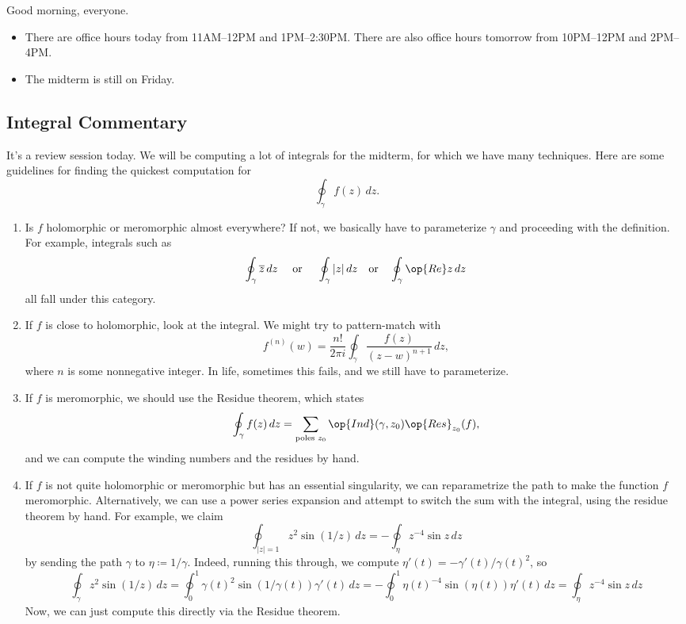 \documentclass[../notes.tex]{subfiles}
\begin{document}

Good morning, everyone.
\begin{itemize}
	\item There are office hours today from 11AM--12PM and 1PM--2:30PM. There are also office hours tomorrow from 10PM--12PM and 2PM--4PM.
	\item The midterm is still on Friday.
\end{itemize}

\subsection{Integral Commentary}
It's a review session today. We will be computing a lot of integrals for the midterm, for which we have many techniques. Here are some guidelines for finding the quickest computation for
\[\oint_\gamma f(z)\,dz.\]
\begin{enumerate}
	\item Is $f$ holomorphic or meromorphic almost everywhere? If not, we basically have to parameterize $\gamma$ and proceeding with the definition. For example, integrals such as
	\[\oint_\gamma\overline z\,dz\quad\text{ or }\quad\oint_\gamma|z|\,dz\quad\text{or}\quad\oint_\gamma\op{Re}z\,dz\]
	all fall under this category.

	\item If $f$ is close to holomorphic, look at the integral. We might try to pattern-match with
	\[f^{(n)}(w)=\frac{n!}{2\pi i}\oint_\gamma\frac{f(z)}{(z-w)^{n+1}}\,dz,\]
	where $n$ is some nonnegative integer. In life, sometimes this fails, and we still have to parameterize.
	\item If $f$ is meromorphic, we should use the Residue theorem, which states
	\[\oint_\gamma f(z)\,dz=\sum_{\text{poles }z_0}\op{Ind}(\gamma,z_0)\op{Res}_{z_0}(f),\]
	and we can compute the winding numbers and the residues by hand.
	\item If $f$ is not quite holomorphic or meromorphic but has an essential singularity, we can reparametrize the path to make the function $f$ meromorphic. Alternatively, we can use a power series expansion and attempt to switch the sum with the integral, using the residue theorem by hand. For example, we claim
	\[\oint_{|z|=1}z^2\sin(1/z)\,dz=-\oint_\eta z^{-4}\sin z\,dz\]
	by sending the path $\gamma$ to $\eta\coloneqq 1/\gamma$. Indeed, running this through, we compute $\eta'(t)=-\gamma'(t)/\gamma(t)^2$, so
	\[\oint_{\gamma}z^2\sin(1/z)\,dz=\oint_0^1\gamma(t)^2\sin(1/\gamma(t))\gamma'(t)\,dz=-\oint_0^1\eta(t)^{-4}\sin(\eta(t))\eta'(t)\,dz=\oint_\eta z^{-4}\sin z\,dz\]
	Now, we can just compute this directly via the Residue theorem.
\end{enumerate}
\end{document}

